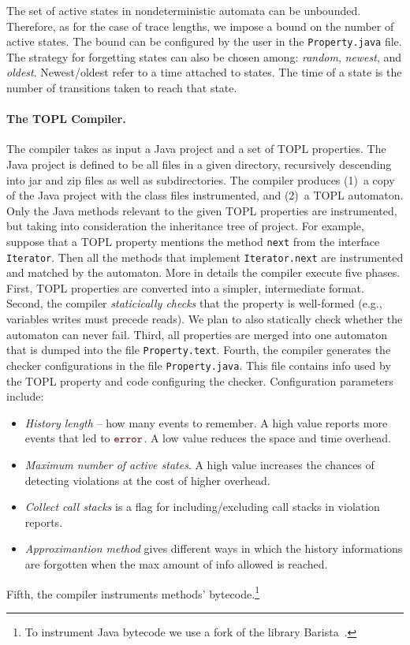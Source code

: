 \documentclass[9pt, preprint]{sigplanconf} %
\newcommand{\error}{\ensuremath{\textcolor{darkred}{\mathtt{error}}}\xspace}
\theoremstyle{definition}
\theoremstyle{remark}
\begin{document}
The set of active states in nondeterministic automata can be unbounded.
Therefore, as for the case of trace lengths, we impose a bound on the number of active states. 
The bound can be configured by the user  in the {\tt Property.java}  file.  
The  strategy for forgetting states can also be chosen among: {\em random}, {\em newest}, and {\em oldest}.
Newest\slash oldest refer to a time attached to states.
The time  of a state is the number of transitions  taken to reach that state.

\paragraph{The TOPL Compiler.} \label{sec:toplc} %
The compiler takes as input a Java project and a set of TOPL properties.
The Java project is defined to be all files in a given directory, recursively descending into jar and zip files as well as  subdirectories.
The compiler produces (1)~a copy of the Java project with the class files instrumented, and (2)~a TOPL automaton.
Only the Java methods relevant to the given TOPL properties are instrumented, but taking into consideration 
 the inheritance tree of  project.
For example, suppose that a TOPL property mentions the method {\tt next} from the interface {\tt Iterator}.
Then all the methods that implement {\tt Iterator.next} are instrumented and  matched by the automaton.
%
More in details the compiler execute  five phases.
First, TOPL properties are converted into a simpler, intermediate format. 
Second, the compiler  {\em staticically checks}  that the property is well-formed (e.g., variables writes must precede reads). We plan to also statically check whether the automaton can never fail.
%
Third,  all properties are merged into one automaton that is  dumped into the file {\tt Property.text}.
%
Fourth, the compiler generates the checker configurations in 
the file {\tt Property.java}. This file contains 
info used by the TOPL property and code configuring the checker.
Configuration parameters include:
\begin{itemize}
\item \emph{History length} -- how many events to remember.
  A high value reports more events that led to \error.
  A low value reduces the space and time overhead.
\item \emph{Maximum number of active states}.
  A high value increases the chances of detecting violations at the cost of higher  overhead.

\item \emph{Collect call stacks} is a flag for including/excluding  call stacks in violation reports.
%
\item {\em Approximantion method} gives different ways in which the history informations are forgotten when  the max amount of info 
allowed is reached.
\end{itemize}
%
Fifth, the compiler instruments methods' bytecode.\footnote{To instrument Java bytecode we use a fork of the library 
Barista~\cite{barista}.}
\end{document}
